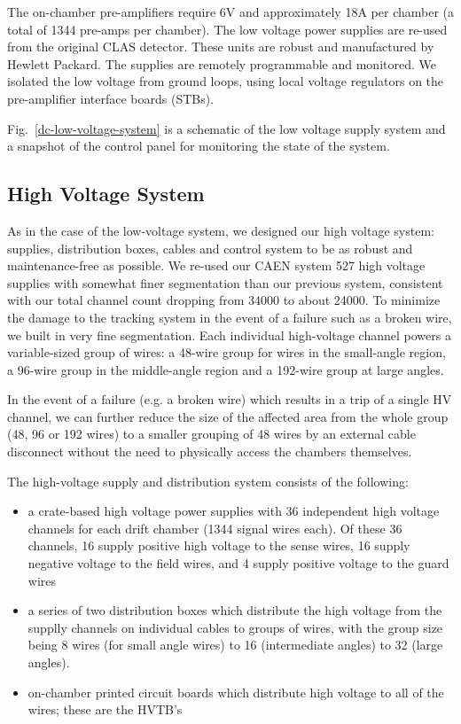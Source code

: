 The on-chamber pre-amplifiers require 6V and approximately 18A per chamber
(a total of 1344 pre-amps per chamber).
The low voltage power supplies are re-used from the original CLAS detector.  
These units are robust and manufactured by Hewlett Packard.  
The supplies are remotely programmable and monitored.   We 
isolated the low voltage from 
ground loops, using local voltage regulators on the pre-amplifier interface 
boards (STBs).  

Fig.~\ref{dc-low-voltage-system} is a schematic of the low voltage
supply system and a snapshot 
of the control panel for monitoring the state of the system.

\subsection{High Voltage System}

As in the case of the low-voltage system, we designed our high voltage system: 
supplies, distribution boxes, cables and control system to be as robust and 
maintenance-free as possible.  
We re-used our CAEN 
system 527 high voltage supplies with somewhat finer segmentation than our 
previous system, consistent with our total channel count dropping from 34000 
to about 24000.
To minimize the damage to the tracking system in the event of a failure such as
a broken wire, we built in very fine segmentation.
Each individual high-voltage channel powers a variable-sized group of 
wires: a 48-wire group for wires in the small-angle region, a 96-wire group
in the middle-angle region and a 192-wire group at large angles.

In the event of a failure (e.g. a broken wire) which results in a trip
of a single HV channel, we can further reduce the size of the affected
area from the whole group (48, 96 or 192 wires) to a smaller grouping
of 48 wires by an external cable disconnect without the need to 
physically access the chambers themselves.

The high-voltage supply and distribution system consists of the following:
\begin{itemize}
\item a crate-based high voltage power supplies with 36 independent
high voltage channels for each drift chamber (1344 signal wires each).
Of these 36 channels, 16 supply positive high voltage to the sense
wires, 16 supply negative voltage to the field wires, and 4 supply
positive voltage to the guard wires
\item a series of two distribution boxes which distribute the high
voltage from the supplly channels on individual cables to groups
of wires, with the group size being 8 wires (for small angle wires)
to 16 (intermediate angles) to 32 (large angles). 
\item  on-chamber printed circuit boards which distribute high voltage
to all of the wires; these are the HVTB's
\end{itemize}



